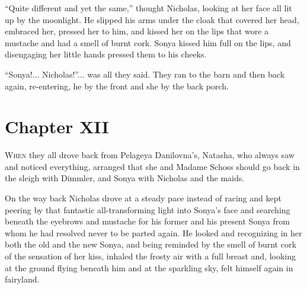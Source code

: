 ``Quite different and yet the same,'' thought Nicholas, looking
at her face all lit up by the moonlight. He slipped his arms
under the cloak that covered her head, embraced her, pressed her
to him, and kissed her on the lips that wore a mustache and had a
smell of burnt cork. Sonya kissed him full on the lips, and
disengaging her little hands pressed them to his cheeks.

``Sonya!... Nicholas!''... was all they said. They ran to the
barn and then back again, re-entering, he by the front and she by
the back porch.


\chapter*{Chapter XII}
\ifaudio
{} 
\fi

\lettrine[lines=2, loversize=0.3, lraise=0]{\initfamily W}{hen}
they all drove back from Pelageya Danilovna's, Natasha, who
always saw and noticed everything, arranged that she and Madame
Schoss should go back in the sleigh with Dimmler, and Sonya with
Nicholas and the maids.

On the way back Nicholas drove at a steady pace instead of racing
and kept peering by that fantastic all-transforming light into
Sonya's face and searching beneath the eyebrows and mustache for
his former and his present Sonya from whom he had resolved never
to be parted again. He looked and recognizing in her both the old
and the new Sonya, and being reminded by the smell of burnt cork
of the sensation of her kiss, inhaled the frosty air with a full
breast and, looking at the ground flying beneath him and at the
sparkling sky, felt himself again in fairyland.

